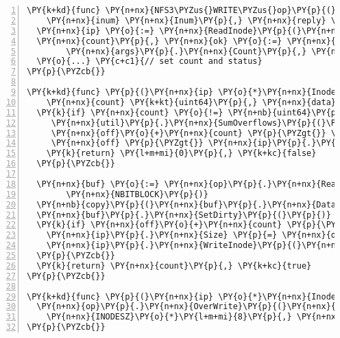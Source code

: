\begin{Verbatim}[commandchars=\\\{\},numbers=left,firstnumber=1,stepnumber=1,codes={\catcode`\$=3\catcode`\^=7\catcode`\_=8},fontsize=\small,numbersep=6pt,xleftmargin=0.2in]
\PY{k+kd}{func} \PY{n+nx}{NFS3\PYZus{}WRITE\PYZus{}op}\PY{p}{(}\PY{n+nx}{op} \PY{o}{*}\PY{n+nx}{Op}\PY{p}{,} \PY{n+nx}{args} \PY{n+nx}{WRITE3args}\PY{p}{,}
    \PY{n+nx}{inum} \PY{n+nx}{Inum}\PY{p}{,} \PY{n+nx}{reply} \PY{o}{*}\PY{n+nx}{WRITE3res}\PY{p}{)} \PY{k+kt}{bool} \PY{p}{\PYZob{}}
  \PY{n+nx}{ip} \PY{o}{:=} \PY{n+nx}{ReadInode}\PY{p}{(}\PY{n+nx}{op}\PY{p}{,} \PY{n+nx}{inum}\PY{p}{)}
  \PY{n+nx}{count}\PY{p}{,} \PY{n+nx}{ok} \PY{o}{:=} \PY{n+nx}{ip}\PY{p}{.}\PY{n+nx}{Write}\PY{p}{(}\PY{n+nx}{op}\PY{p}{,} \PY{n+nx}{args}\PY{p}{.}\PY{n+nx}{Offset}\PY{p}{,}
        \PY{n+nx}{args}\PY{p}{.}\PY{n+nx}{Count}\PY{p}{,} \PY{n+nx}{args}\PY{p}{.}\PY{n+nx}{Data}\PY{p}{)}
  \PY{o}{...} \PY{c+c1}{// set count and status}
\PY{p}{\PYZcb{}}

\PY{k+kd}{func} \PY{p}{(}\PY{n+nx}{ip} \PY{o}{*}\PY{n+nx}{Inode}\PY{p}{)} \PY{n+nx}{Write}\PY{p}{(}\PY{n+nx}{op} \PY{o}{*}\PY{n+nx}{Op}\PY{p}{,} \PY{n+nx}{off} \PY{k+kt}{uint64}\PY{p}{,}
    \PY{n+nx}{count} \PY{k+kt}{uint64}\PY{p}{,} \PY{n+nx}{data} \PY{p}{[}\PY{p}{]}\PY{k+kt}{byte}\PY{p}{)} \PY{p}{(}\PY{k+kt}{uint64}\PY{p}{,} \PY{k+kt}{bool}\PY{p}{)} \PY{p}{\PYZob{}}
  \PY{k}{if} \PY{n+nx}{count} \PY{o}{!=} \PY{n+nb}{uint64}\PY{p}{(}\PY{n+nb}{len}\PY{p}{(}\PY{n+nx}{data}\PY{p}{)}\PY{p}{)} \PY{o}{||}
     \PY{n+nx}{util}\PY{p}{.}\PY{n+nx}{SumOverflows}\PY{p}{(}\PY{n+nx}{off}\PY{p}{,} \PY{n+nx}{count}\PY{p}{)} \PY{o}{||}
     \PY{n+nx}{off}\PY{o}{+}\PY{n+nx}{count} \PY{p}{\PYZgt{}} \PY{n+nx}{disk}\PY{p}{.}\PY{n+nx}{BlockSize} \PY{o}{||}
     \PY{n+nx}{off} \PY{p}{\PYZgt{}} \PY{n+nx}{ip}\PY{p}{.}\PY{n+nx}{Size} \PY{p}{\PYZob{}}
    \PY{k}{return} \PY{l+m+mi}{0}\PY{p}{,} \PY{k+kc}{false}
  \PY{p}{\PYZcb{}}

  \PY{n+nx}{buf} \PY{o}{:=} \PY{n+nx}{op}\PY{p}{.}\PY{n+nx}{ReadBuf}\PY{p}{(}\PY{n+nx}{block2addr}\PY{p}{(}\PY{n+nx}{ip}\PY{p}{.}\PY{n+nx}{Data}\PY{p}{)}\PY{p}{,}
        \PY{n+nx}{NBITBLOCK}\PY{p}{)}
  \PY{n+nb}{copy}\PY{p}{(}\PY{n+nx}{buf}\PY{p}{.}\PY{n+nx}{Data}\PY{p}{[}\PY{n+nx}{off}\PY{p}{:}\PY{p}{]}\PY{p}{,} \PY{n+nx}{data}\PY{p}{)}
  \PY{n+nx}{buf}\PY{p}{.}\PY{n+nx}{SetDirty}\PY{p}{(}\PY{p}{)}
  \PY{k}{if} \PY{n+nx}{off}\PY{o}{+}\PY{n+nx}{count} \PY{p}{\PYZgt{}} \PY{n+nx}{ip}\PY{p}{.}\PY{n+nx}{Size} \PY{p}{\PYZob{}}
    \PY{n+nx}{ip}\PY{p}{.}\PY{n+nx}{Size} \PY{p}{=} \PY{n+nx}{off} \PY{o}{+} \PY{n+nx}{count}
    \PY{n+nx}{ip}\PY{p}{.}\PY{n+nx}{WriteInode}\PY{p}{(}\PY{n+nx}{op}\PY{p}{)}
  \PY{p}{\PYZcb{}}
  \PY{k}{return} \PY{n+nx}{count}\PY{p}{,} \PY{k+kc}{true}
\PY{p}{\PYZcb{}}

\PY{k+kd}{func} \PY{p}{(}\PY{n+nx}{ip} \PY{o}{*}\PY{n+nx}{Inode}\PY{p}{)} \PY{n+nx}{WriteInode}\PY{p}{(}\PY{n+nx}{op} \PY{o}{*}\PY{n+nx}{Op}\PY{p}{)} \PY{p}{\PYZob{}}
  \PY{n+nx}{op}\PY{p}{.}\PY{n+nx}{OverWrite}\PY{p}{(}\PY{n+nx}{inum2Addr}\PY{p}{(}\PY{n+nx}{ip}\PY{p}{.}\PY{n+nx}{Inum}\PY{p}{)}\PY{p}{,}
    \PY{n+nx}{INODESZ}\PY{o}{*}\PY{l+m+mi}{8}\PY{p}{,} \PY{n+nx}{ip}\PY{p}{.}\PY{n+nx}{Encode}\PY{p}{(}\PY{p}{)}\PY{p}{)}
\PY{p}{\PYZcb{}}
\end{Verbatim}
